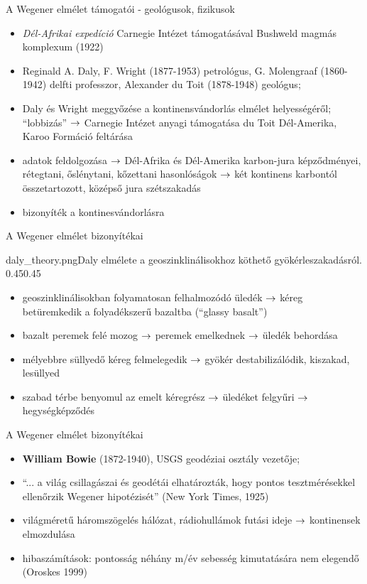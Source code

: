 \documentclass{beamer}
\begin{document}
\begin{frame}{A Wegener elmélet támogatói - geológusok, fizikusok}
    \begin{itemize}
        \item \textit{Dél-Afrikai expedíció} Carnegie Intézet támogatásával Bushweld magmás komplexum (1922)
        \item Reginald A. Daly, F. Wright (1877-1953) petrológus, G. Molengraaf (1860-1942) delfti professzor, Alexander du Toit (1878-1948) geológus;
        \item Daly és Wright meggyőzése a kontinensvándorlás elmélet helyességéről; ``lobbizás'' $\rightarrow$ Carnegie Intézet anyagi támogatása du Toit Dél-Amerika, Karoo Formáció feltárása
        \item adatok feldolgozása $\rightarrow$ Dél-Afrika és Dél-Amerika karbon-jura képződményei, rétegtani, őslénytani, kőzettani hasonlóságok $\rightarrow$ két kontinens karbontól összetartozott, középső jura szétszakadás
        \item bizonyíték a kontinesvándorlásra
    \end{itemize}
\end{frame}


\begin{frame}{A Wegener elmélet bizonyítékai}
    \begin{figp}{daly_theory.png}{Daly elmélete a geoszinklinálisokhoz köthető gyökérleszakadásról. }{0.45}{0.45}
        \begin{itemize}
            \item geoszinklinálisokban folyamatosan felhalmozódó üledék $\rightarrow$ kéreg betüremkedik a folyadékszerű bazaltba (``glassy basalt'')
            \item bazalt peremek felé mozog $\rightarrow$ peremek emelkednek $\rightarrow$ üledék behordása
            \item mélyebbre süllyedő kéreg felmelegedik $\rightarrow$ gyökér destabilizálódik, kiszakad, lesüllyed
            \item szabad térbe benyomul az emelt kéregrész $\rightarrow$ üledéket felgyűri $\rightarrow$ hegységképződés
        \end{itemize}
    \end{figp}
\end{frame}


\begin{frame}{A Wegener elmélet bizonyítékai}
    \begin{itemize}
        \item \textbf{William Bowie} (1872-1940), USGS geodéziai osztály vezetője;
        \item ``... a világ csillagászai és geodétái elhatározták, hogy pontos tesztmérésekkel ellenőrzik Wegener hipotézisét'' (New York Times, 1925)
        \item világméretű háromszögelés hálózat, rádiohullámok futási ideje $\rightarrow$ kontinensek elmozdulása
        \item hibaszámítások: pontosság néhány m/év sebesség kimutatására nem elegendő (Oroskes 1999)
    \end{itemize}
\end{frame}
\end{document}
